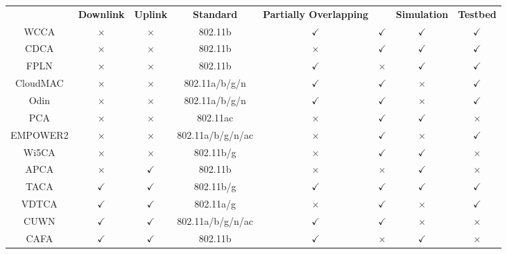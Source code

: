 \begin{table*}
\begin{tabular}{|c|c|c|c|c|c|c|c|}
		&\textbf{\quad Downlink \quad}& \textbf{\quad Uplink \quad}& \textbf{\quad\quad Standard \quad\quad} & \textbf{\quad Partially Overlapping \quad} & & \textbf{Simulation} & \textbf{Testbed}\\ \Xhline{3\arrayrulewidth}
		WCCA \cite{Wcolor-2005} &$\times$&$\times$&802.11b&$\checkmark$&$\checkmark$&$\checkmark$&$\checkmark$\\\hline
	    CDCA \cite{J-DCA-LB-2006}&$\times$&$\times$&802.11b&$\times$&$\checkmark$&$\checkmark$&$\checkmark$\\\hline
		FPLN \cite{CAPWAP-based-CA-11}&$\times$&$\times$&802.11b&$\checkmark$&$\times$&$\checkmark$&$\checkmark$\\\hline					
		CloudMAC \cite{CloudMAC}&$\times$&$\times$&802.11a/b/g/n&$\checkmark$&$\checkmark$&$\times$&$\checkmark$\\\hline		
		Odin \cite{Odin2}&$\times$&$\times$&802.11a/b/g/n&$\checkmark$&$\checkmark$&$\times$&$\checkmark$\\\hline				
		PCA \cite{802.11ac-PCA}&$\times$&$\times$&802.11ac&$\times$&$\checkmark$&$\checkmark$&$\times$\\\hline		
		EMPOWER2 \cite{Primitives}&$\times$&$\times$&802.11a/b/g/n/ac&$\times$&$\checkmark$&$\times$&$\checkmark$\\\hline		
		Wi5CA \cite{DCA-2}&$\times$&$\times$&802.11b/g&$\times$&$\checkmark$&$\checkmark$&$\times$		 \\\hline
		APCA \cite{J-AP-DCA-2006}&$\times$&$\checkmark$&802.11b&$\times$&$\times$&$\checkmark$&$\times$\\\hline		
		TACA \cite{Traffic-aware-CA-2007}&$\checkmark$&$\checkmark$&802.11b/g&$\checkmark$&$\checkmark$&$\checkmark$&$\checkmark$\\\hline
		VDTCA \cite{Measurement-CA-WCNC-10}&$\checkmark$&$\checkmark$&802.11a/g&$\times$&$\checkmark$&$\times$&$\checkmark$\\\hline					
		CUWN \cite{Cisco}&$\checkmark$&$\checkmark$&802.11a/b/g/n/ac&$\checkmark$&$\checkmark$&$\times$&$\times$\\\hline					
		CAFA \cite{CA-F-WCNC-11}&$\checkmark$&$\checkmark$&802.11b&$\checkmark$&$\times$&$\checkmark$&$\times$ \\\hline

\end{tabular}
\end{table*}
